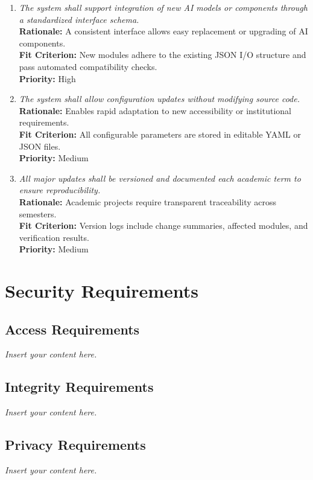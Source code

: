 \documentclass[12pt]{article}
\newcommand{\lips}{\textit{Insert your content here.}}
\begin{document}
\begin{enumerate}[label=MS-AD\arabic*., wide=0pt, leftmargin=*]
  \item \emph{The system shall support integration of new AI models or components through a standardized interface schema.}\\[2mm]
    {\bf Rationale:} A consistent interface allows easy replacement or upgrading of AI components.\\
    {\bf Fit Criterion:} New modules adhere to the existing JSON I/O structure and pass automated compatibility checks.\\
    {\bf Priority:} High

  \item \emph{The system shall allow configuration updates without modifying source code.}\\[2mm]
    {\bf Rationale:} Enables rapid adaptation to new accessibility or institutional requirements.\\
    {\bf Fit Criterion:} All configurable parameters are stored in editable YAML or JSON files.\\
    {\bf Priority:} Medium

  \item \emph{All major updates shall be versioned and documented each academic term to ensure reproducibility.}\\[2mm]
    {\bf Rationale:} Academic projects require transparent traceability across semesters.\\
    {\bf Fit Criterion:} Version logs include change summaries, affected modules, and verification results.\\
    {\bf Priority:} Medium
\end{enumerate}



\section{Security Requirements}
\subsection{Access Requirements}
\lips
\subsection{Integrity Requirements}
\lips
\subsection{Privacy Requirements}
\lips
\end{document}
